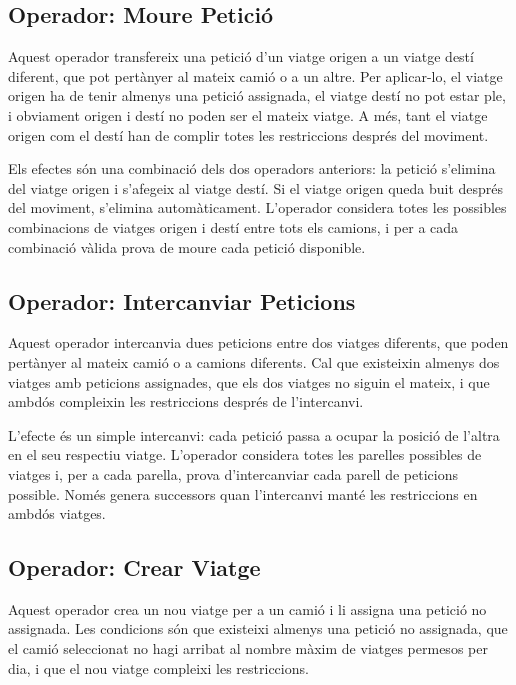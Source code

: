 \subsection{Operador: Moure Petició}

Aquest operador transfereix una petició d'un viatge origen a un viatge destí diferent, que pot pertànyer al mateix camió o a un altre. Per aplicar-lo, el viatge origen ha de tenir almenys una petició assignada, el viatge destí no pot estar ple, i obviament origen i destí no poden ser el mateix viatge. A més, tant el viatge origen com el destí han de complir totes les restriccions després del moviment.

Els efectes són una combinació dels dos operadors anteriors: la petició s'elimina del viatge origen i s'afegeix al viatge destí. Si el viatge origen queda buit després del moviment, s'elimina automàticament. L'operador considera totes les possibles combinacions de viatges origen i destí entre tots els camions, i per a cada combinació vàlida prova de moure cada petició disponible.

\subsection{Operador: Intercanviar Peticions}

Aquest operador intercanvia dues peticions entre dos viatges diferents, que poden pertànyer al mateix camió o a camions diferents. Cal que existeixin almenys dos viatges amb peticions assignades, que els dos viatges no siguin el mateix, i que ambdós compleixin les restriccions després de l'intercanvi.

L'efecte és un simple intercanvi: cada petició passa a ocupar la posició de l'altra en el seu respectiu viatge. L'operador considera totes les parelles possibles de viatges i, per a cada parella, prova d'intercanviar cada parell de peticions possible. Només genera successors quan l'intercanvi manté les restriccions en ambdós viatges.

\subsection{Operador: Crear Viatge}

Aquest operador crea un nou viatge per a un camió i li assigna una petició no assignada. Les condicions són que existeixi almenys una petició no assignada, que el camió seleccionat no hagi arribat al nombre màxim de viatges permesos per dia, i que el nou viatge compleixi les restriccions.

